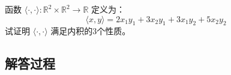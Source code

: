 \begin{example}[内积性质验证]
    函数 \(\langle \cdot, \cdot \rangle : \mathbb{R}^2 \times \mathbb{R}^2 \rightarrow \mathbb{R}\) 定义为：
    \[
    \langle x, y \rangle = 2x_1y_1 + 3x_2y_1 + 3x_1y_2 + 5x_2y_2
    \]
    试证明 \(\langle \cdot, \cdot \rangle \) 满足内积的3个性质。
    \end{example}
    
    \subsection*{解答过程}
    